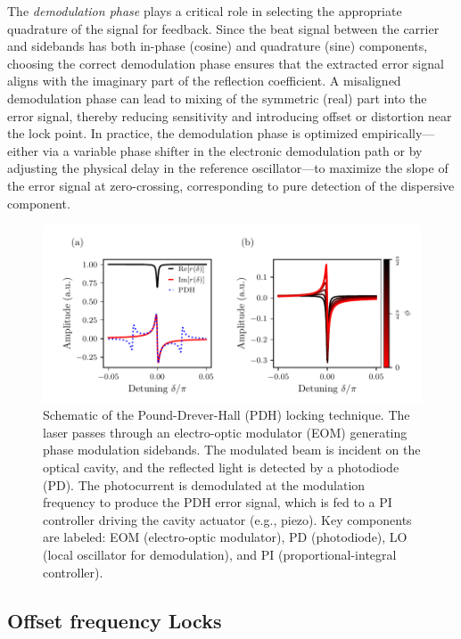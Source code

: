 \noindent The \textit{demodulation phase} plays a critical role in selecting the appropriate quadrature of the signal for feedback. Since the beat signal between the carrier and sidebands has both in-phase (cosine) and quadrature (sine) components, choosing the correct demodulation phase ensures that the extracted error signal aligns with the imaginary part of the reflection coefficient. A misaligned demodulation phase can lead to mixing of the symmetric (real) part into the error signal, thereby reducing sensitivity and introducing offset or distortion near the lock point. In practice, the demodulation phase is optimized empirically---either via a variable phase shifter in the electronic demodulation path or by adjusting the physical delay in the reference oscillator---to maximize the slope of the error signal at zero-crossing, corresponding to pure detection of the dispersive component.
\begin{figure}[htbp]
    \centering
    \includegraphics[width=\textwidth]{./chap3/fig/PDHplots.pdf}
    \caption{
        Schematic of the Pound-Drever-Hall (PDH) locking technique. 
        The laser passes through an electro-optic modulator (EOM) generating phase modulation sidebands. 
        The modulated beam is incident on the optical cavity, and the reflected light is detected by a photodiode (PD). 
        The photocurrent is demodulated at the modulation frequency to produce the PDH error signal, which is fed to a PI controller driving the cavity actuator (e.g., piezo). 
        Key components are labeled: EOM (electro-optic modulator), PD (photodiode), LO (local oscillator for demodulation), and PI (proportional-integral controller).
    }\label{fig:PDH_scheme}
\end{figure}



\subsection{Offset frequency Locks}

